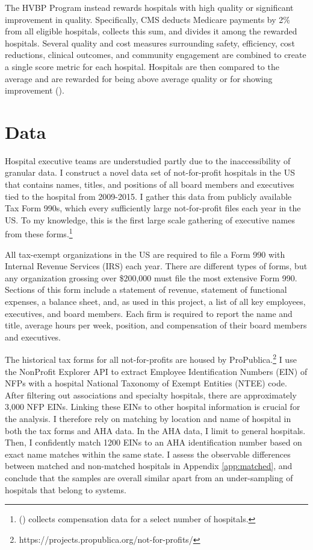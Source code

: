 \documentclass[12pt]{article}
\begin{document}
    The HVBP Program instead rewards hospitals with high quality or significant improvement in quality. Specifically, CMS deducts Medicare payments by 2\% from all eligible hospitals, collects this sum, and divides it among the rewarded hospitals. Several quality and cost measures surrounding safety, efficiency, cost reductions, clinical outcomes, and community engagement are combined to create a single score metric for each hospital. Hospitals are then compared to the average and are rewarded for being above average quality or for showing improvement (\cite{CMS_2023}). 

    

	\section{Data}\label{sec:data}

    Hospital executive teams are understudied partly due to the inaccessibility of granular data. I construct a novel data set of not-for-profit hospitals in the US that contains names, titles, and positions of all board members and executives tied to the hospital from 2009-2015. I gather this data from publicly available Tax Form 990s, which every sufficiently large not-for-profit files each year in the US. To my knowledge, this is the first large scale gathering of executive names from these forms.\footnote{\citeauthor{brickley2010board} (\citeyear{brickley2010board}) collects compensation data for a select number of hospitals.} 

    All tax-exempt organizations in the US are required to file a Form 990 with Internal Revenue Services (IRS) each year. There are different types of forms, but any organization grossing over \$200,000 must file the most extensive Form 990. Sections of this form include a statement of revenue, statement of functional expenses, a balance sheet, and, as used in this project, a list of all key employees, executives, and board members. Each firm is required to report the name and title, average hours per week, position, and compensation of their board members and executives. 

    The historical tax forms for all not-for-profits are housed by ProPublica.\footnote{https://projects.propublica.org/not-for-profits/} I use the NonProfit Explorer API to extract Employee Identification Numbers (EIN) of NFPs with a hospital National Taxonomy of Exempt Entities (NTEE) code. After filtering out associations and specialty hospitals, there are approximately 3,000 NFP EINs. Linking these EINs to other hospital information is crucial for the analysis. I therefore rely on matching by location and name of hospital in both the tax forms and AHA data. In the AHA data, I limit to general hospitals. Then, I confidently match 1200 EINs to an AHA identification number based on exact name matches within the same state. I assess the observable differences between matched and non-matched hospitals in Appendix \ref{app:matched}, and conclude that the samples are overall similar apart from an under-sampling of hospitals that belong to systems.
    
\end{document}
